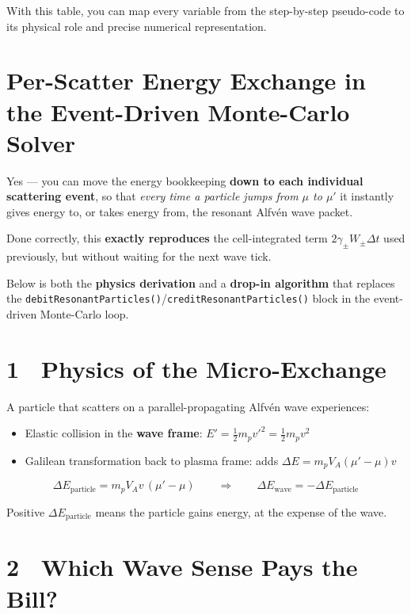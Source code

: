 {\noindent
With this table, you can map every variable from the step-by-step pseudo-code to its physical role and precise numerical representation.


\section*{Per-Scatter Energy Exchange in the Event-Driven Monte-Carlo Solver}

Yes — you can move the energy bookkeeping \textbf{down to each individual scattering event}, so that \emph{every time a particle jumps from $\mu$ to $\mu'$} it instantly gives energy to, or takes energy from, the resonant Alfvén wave packet.

Done correctly, this \textbf{exactly reproduces} the cell-integrated term $2\gamma_\pm W_\pm \Delta t$ used previously, but without waiting for the next wave tick.

\vspace{1em}

\noindent
Below is both the \textbf{physics derivation} and a \textbf{drop-in algorithm} that replaces the \texttt{debitResonantParticles()}/\texttt{creditResonantParticles()} block in the event-driven Monte-Carlo loop.

\section*{1 Physics of the Micro-Exchange}

A particle that scatters on a parallel-propagating Alfvén wave experiences:

\begin{itemize}
  \item Elastic collision in the \textbf{wave frame}: $E' = \tfrac{1}{2} m_p v'^2 = \tfrac{1}{2} m_p v^2$
  \item Galilean transformation back to plasma frame: adds $\Delta E = m_p V_A ( \mu' - \mu ) v$
\end{itemize}

\begin{tcolorbox}
\[
\boxed{
\Delta E_{\text{particle}} = m_p V_A v\,(\mu' - \mu)
\qquad\Rightarrow\qquad
\Delta E_{\text{wave}} = -\Delta E_{\text{particle}}
}
\tag{A}
\]
\end{tcolorbox}

Positive $\Delta E_{\text{particle}}$ means the particle gains energy, at the expense of the wave.

\section*{2 Which Wave Sense Pays the Bill?}

}
